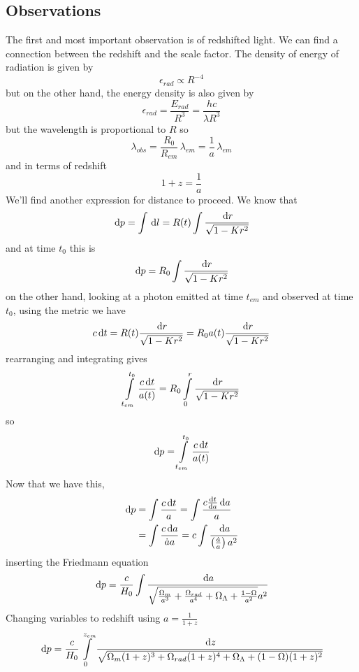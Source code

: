 \subsection{Observations}
The first and most important observation is of redshifted light. We can find a connection between the redshift and the scale factor. The density of energy of radiation is given by
\begin{equation}
    \epsilon_{rad} \propto R^{-4}
\end{equation}
but on the other hand, the energy density is also given by
\begin{equation}
    \epsilon_{rad} = \frac{E_{rad}}{R^3} = \frac{hc}{\lambda R^3}
\end{equation}
but the wavelength is proportional to \(R\) so
\begin{equation}
    \lambda_{obs} = \frac{R_0}{R_{em}}\, \lambda_{em} = \frac{1}{a}\,\lambda_{em}
\end{equation}
and in terms of redshift
\begin{equation}
    1 + z = \frac{1}{a}
\end{equation}
We'll find another expression for distance to proceed. We know that
\begin{equation}
    \dl p = \int \dl l = R(t) \int \frac{\dl r}{\sqrt{1-Kr^2}}
\end{equation}
and at time \(t_0\) this is
\begin{equation}
    \dl p = R_0 \int \frac{\dl r}{\sqrt{1-Kr^2}}
\end{equation}
on the other hand, looking at a photon emitted at time \(t_{em}\) and observed at time \(t_0\), using the metric we have
\begin{equation}
    c \dl t = R(t) \frac{\dl r}{\sqrt{1-Kr^2}} = R_0 a(t) \frac{\dl r}{\sqrt{1-Kr^2}}
\end{equation}
rearranging and integrating gives
\begin{equation}
   \int\limits_{t_{em}}^{t_0} \frac{c \dl t}{a(t)} = R_0 \int\limits_{0}^{r} \frac{\dl r}{\sqrt{1-Kr^2}}
\end{equation}
so
\begin{equation}
    \dl p = \int\limits_{t_{em}}^{t_0} \frac{c \dl t}{a(t)}
\end{equation}
Now that we have this, 
\begin{align}
    \dl p &= \int\frac{c\dl t}{a} = \int \frac{c \diff{t}{a}\dl a}{a}\\
    &= \int\frac{c\dl a}{\dot{a}a} = c\int\frac{\dl a}{\ins{\frac{\dot{a}}{a}}a^2} 
\end{align}
inserting the Friedmann equation
\begin{equation}
    \dl p = \frac{c}{H_0} \int \frac{\dl a}{\sqrt{\frac{\Omega_{m}}{a^3} + \frac{\Omega_{rad}}{a^4} + \Omega_\Lambda + \frac{1-\Omega}{a^2}} a^2}
\end{equation}
Changing variables to redshift using \(a = \frac{1}{1+z}\)
\begin{equation}
    \dl p = \frac{c}{H_0} \int\limits_0^{z_{em}} \frac{\dl z}{\sqrt{\Omega_m (1+z)^3 + \Omega_{rad} (1+z)^4 + \Omega_\Lambda + (1-\Omega)(1+z)^2}}
\end{equation}
